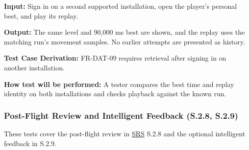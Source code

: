 \documentclass[12pt, titlepage]{article}
\begin{document}
{\begin{enumerate}
\textbf{Input:} Sign in on a second supported installation, open the player's
personal best, and play its replay.

\textbf{Output:} The same level and 90,000 ms best are shown, and the replay uses
the matching run's movement samples. No earlier attempts are presented as history.

\textbf{Test Case Derivation:} \mbox{FR-DAT-09} requires retrieval after signing in on
another installation.

\textbf{How test will be performed:} A tester compares the best time and replay
identity on both installations and checks playback against the known run.

\end{enumerate}
\par}

\subsubsection{Post-Flight Review and Intelligent Feedback (S.2.8, S.2.9)}

These tests cover the post-flight review in \hyperlink{abbr:SRS}{SRS} S.2.8 and the optional intelligent
feedback in S.2.9.
\end{document}
